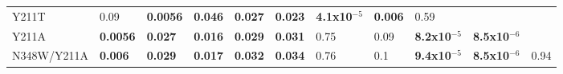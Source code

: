 \documentclass[12pt]{article}
\begin{document}
\begin {table}[H]
\begin{center}
{\begin{tabular}{l l l l l l l l l l l}
    Y211T       & 0.09                    & \textbf{0.0056}         & \textbf{0.046}          & \textbf{0.027}          & \textbf{0.023}          & \textbf{4.1x10$^{-5}$}    & \textbf{0.006}          & 0.59                    &                         &        \\
    Y211A       & \textbf{0.0056}         & \textbf{0.027}          & \textbf{0.016}          & \textbf{0.029}          & \textbf{0.031}          & 0.75                      & 0.09                    & \textbf{8.2x10$^{-5}$}  & \textbf{8.5x10$^{-6}$}  &        \\
    N348W/Y211A & \textbf{0.006}          & \textbf{0.029}          & \textbf{0.017}          & \textbf{0.032}          & \textbf{0.034}          & 0.76                      & 0.1                     & \textbf{9.4x10$^{-5}$}  & \textbf{8.5x10$^{-6}$}  & 0.94  \\
    \hline
    \end{tabular}
  }
\end{center}
\end{table}
\end{document}
